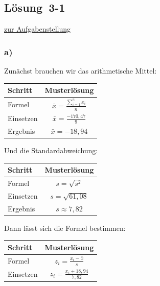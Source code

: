 \documentclass[
  11pt,
  ngerman,
  a4paper,
]{report}
\begin{document}
\hypertarget{loesung-3-1}{%
\subsection{Lösung~3-1}\label{loesung-3-1}}

\protect\hyperlink{aufgabe-3-1}{zur Aufgabenstellung}

\hypertarget{a-8}{%
\subsubsection{a)}\label{a-8}}

Zunächst brauchen wir das arithmetische Mittel:

\begin{table}[H]
\centering
\begin{tabular}{lc}
\toprule
Schritt & Musterlösung\\
\midrule
Formel & $\bar{x}=\frac{\sum\limits_{i=1}^{n}x_{i}}{n}$\\
Einsetzen & $\bar{x}=\frac{-170{,}47}{9}$\\
Ergebnis & $\bar{x}=-18{,}94$\\
\bottomrule
\end{tabular}
\end{table}

Und die Standardabweichung:

\begin{table}[H]
\centering
\begin{tabular}{lc}
\toprule
Schritt & Musterlösung\\
\midrule
Formel & $s=\sqrt{s^2}$\\
Einsetzen & $s=\sqrt{61{,}08}$\\
Ergebnis & $s\approx7{,}82$\\
\bottomrule
\end{tabular}
\end{table}

Dann lässt sich die Formel bestimmen:

\begin{table}[H]
\centering
\begin{tabular}{lc}
\toprule
Schritt & Musterlösung\\
\midrule
Formel & $z_{i} = \frac{x_{i} - \bar{x}}{s}$\\
Einsetzen & $z_{i} = \frac{x_{i} +18{,}94}{7{,}82}$\\
\bottomrule
\end{tabular}
\end{table}
\end{document}
